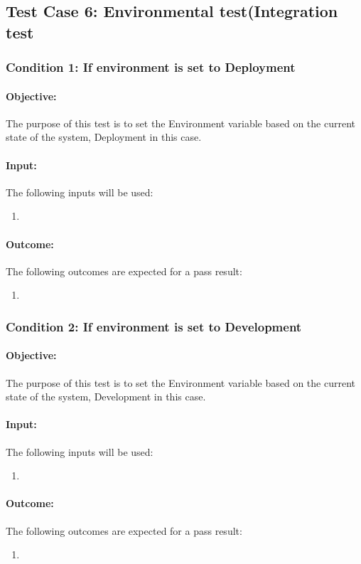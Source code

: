 \documentclass{article}
\begin{document}
\subsection{Test Case 6: Environmental test(Integration test}\label{test6}
\subsubsection{Condition 1: If environment is set to Deployment }
\paragraph{Objective:} The purpose of this test is to set the Environment variable based on the current state of the system, Deployment in this case.
\paragraph{Input:} The following inputs will be used:
\begin{enumerate}
	\item 
\end{enumerate}
\paragraph{Outcome:} The following outcomes are expected for a pass result:
\begin{enumerate}
	\item 
\end{enumerate}
\subsubsection{Condition 2: If environment is set to Development }
\paragraph{Objective:} The purpose of this test is to set the Environment variable based on the current state of the system, Development in this case.
\paragraph{Input:} The following inputs will be used:
\begin{enumerate}
	\item 
\end{enumerate}
\paragraph{Outcome:} The following outcomes are expected for a pass result:
\begin{enumerate}
	\item 
\end{enumerate}
\end{document}

